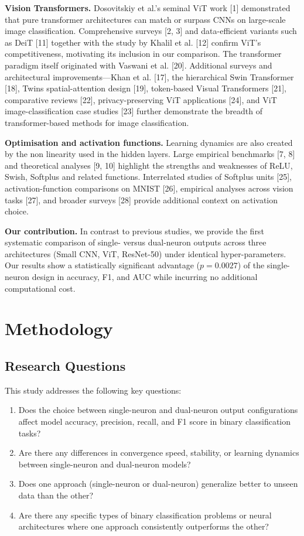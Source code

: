 \documentclass[11pt]{article}
\begin{document}
\textbf{Vision Transformers.} Dosovitskiy et al.'s seminal ViT work [1] demonstrated that pure transformer architectures can match or surpass CNNs on large-scale image classification. Comprehensive surveys [2, 3] and data-efficient variants such as DeiT [11] together with the study by Khalil et al. [12] confirm ViT's competitiveness, motivating its inclusion in our comparison. The transformer paradigm itself originated with Vaswani et al. [20]. Additional surveys and architectural improvements—Khan et al. [17], the hierarchical Swin Transformer [18], Twins spatial-attention design [19], token-based Visual Transformers [21], comparative reviews [22], privacy-preserving ViT applications [24], and ViT image-classification case studies [23] further demonstrate the breadth of transformer-based methods for image classification.

\textbf{Optimisation and activation functions.} Learning dynamics are also created by the non linearity used in the hidden layers. Large empirical benchmarks [7, 8] and theoretical analyses [9, 10] highlight the strengths and weaknesses of ReLU, Swish, Softplus and related functions. Interrelated studies of Softplus units [25], activation-function comparisons on MNIST [26], empirical analyses across vision tasks [27], and broader surveys [28] provide additional context on activation choice.

\textbf{Our contribution.}  In contrast to previous studies, we provide the first systematic comparison of single- versus dual-neuron outputs across three architectures (Small CNN, ViT, ResNet-50) under identical hyper-parameters. Our results show a statistically significant advantage ($p = 0.0027$) of the single-neuron design in accuracy, F1, and AUC while incurring no additional computational cost.

\section{Methodology}
\subsection{Research Questions}
This study addresses the following key questions:
\begin{enumerate}
\item Does the choice between single-neuron and dual-neuron output configurations affect model accuracy, precision, recall, and F1 score in binary classification tasks?
\item Are there any differences in convergence speed, stability, or learning dynamics between single-neuron and dual-neuron models?
\item Does one approach (single-neuron or dual-neuron) generalize better to unseen data than the other?
\item Are there any specific types of binary classification problems or neural architectures where one approach consistently outperforms the other?
\end{enumerate}
\end{document}
